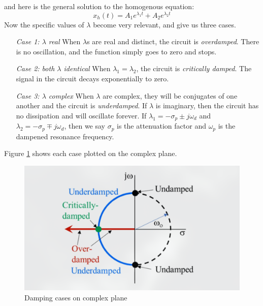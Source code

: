\documentclass[nobib]{tufte-handout}
\begin{document}
and here is the general solution
to the homogenous equation:
\begin{equation}
    x_h(t) = A_1 e^{\lambda_1 t} + A_2 e^{\lambda_2 t}
\end{equation}
Now the specific values of $\lambda$ 
become very relevant, and give us three cases. 
\begin{itemize}
    \item[\emph{Case 1: $\lambda$ real}]
    When $\lambda$s are real and distinct, the 
    circuit is \emph{overdamped}. There is 
    no oscillation, and the function simply goes to
    zero and stops. 
    \item[\emph{Case 2: both $\lambda$ identical}]
    When $\lambda_1 = \lambda_2$, the circuit 
    is \emph{critically damped}. The signal 
    in the circuit decays exponentially to zero. 
    \item[\emph{Case 3: $\lambda$ complex}] When $\lambda$ are complex, they will 
    be conjugates of one another and 
    the circuit is \emph{underdamped}. 
    If $\lambda$ is imaginary, then 
    the circuit has no dissipation and 
    will oscillate forever. If 
    $\lambda_1 = -\sigma_p \pm j\omega_d$ 
    and $\lambda_2 = -\sigma_p \mp j\omega_d$,
    then we say $\sigma_p$ is the attenuation 
    factor and $\omega_p$ is the dampened 
    resonance frequency. 
\end{itemize}
Figure \ref{fig:roots}
shows each case plotted on the complex plane. 
\begin{figure}
    \begin{center}
        \includegraphics{images/roots.png}
    \end{center}
    \caption{Damping cases on complex plane}
    \label{fig:roots}
\end{figure}
\end{document}
